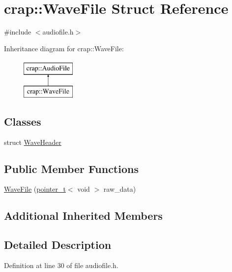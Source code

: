 \hypertarget{structcrap_1_1_wave_file}{}\section{crap\+:\+:Wave\+File Struct Reference}
\label{structcrap_1_1_wave_file}


{\ttfamily \#include $<$audiofile.\+h$>$}

Inheritance diagram for crap\+:\+:Wave\+File\+:\begin{figure}[H]
\begin{center}
\leavevmode
\includegraphics[height=2.000000cm]{structcrap_1_1_wave_file}
\end{center}
\end{figure}
\subsection*{Classes}
\begin{DoxyCompactItemize}
\item 
struct \hyperlink{structcrap_1_1_wave_file_1_1_wave_header}{Wave\+Header}
\end{DoxyCompactItemize}
\subsection*{Public Member Functions}
\begin{DoxyCompactItemize}
\item 
\hyperlink{structcrap_1_1_wave_file_a3579a949926180dc03436a229f533a4d}{Wave\+File} (\hyperlink{structcrap_1_1pointer__t}{pointer\+\_\+t}$<$ void $>$ raw\+\_\+data)
\end{DoxyCompactItemize}
\subsection*{Additional Inherited Members}


\subsection{Detailed Description}


Definition at line 30 of file audiofile.\+h.



